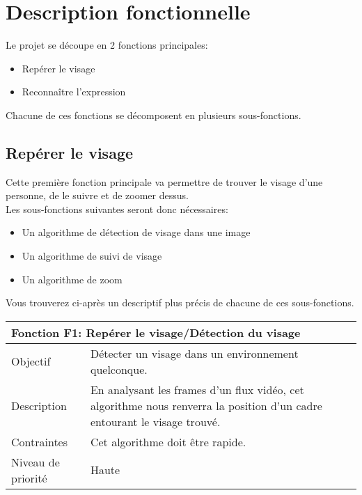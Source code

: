 \documentclass[poster]{polytech/polytech}
\begin{document}
\section{Description fonctionnelle}
Le projet se découpe en 2 fonctions principales:
\begin{itemize}
\item Repérer le visage
\item Reconnaître l'expression\\
\end{itemize}

Chacune de ces fonctions se décomposent en plusieurs sous-fonctions.

\subsection{Repérer le visage}
Cette première fonction principale va permettre de trouver le visage d'une personne, de le suivre et de zoomer dessus.\\
Les sous-fonctions suivantes seront donc nécessaires:
\begin{itemize}
\item Un algorithme de détection de visage dans une image
\item Un algorithme de suivi de visage
\item Un algorithme de zoom\\
\end{itemize}

Vous trouverez ci-après un descriptif plus précis de chacune de ces sous-fonctions.

\begin{tabular}{|l|p{12.5cm}|}
   \hline
   \multicolumn{2}{|l|}{\textbf{Fonction F1: Repérer le visage/Détection du visage}} \\
   \hline
   Objectif &Détecter un visage dans un environnement quelconque.\\
   \hline
   Description &En analysant les frames d'un flux vidéo, cet algorithme nous renverra la position d'un cadre entourant le visage trouvé.\\
   \hline
   Contraintes &Cet algorithme doit être rapide. \\
   \hline
   Niveau de priorité &Haute \\
   \hline
\end{tabular}
\end{document}
